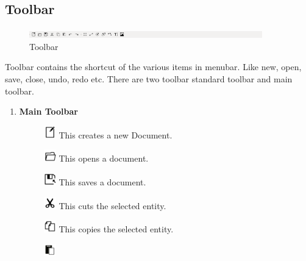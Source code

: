 \subsection{Toolbar}
\begin{figure}[h!]
\centering
\includegraphics[width=0.9\textwidth]{images/toolbar.png}
\caption{Toolbar}
\end{figure}
Toolbar contains the shortcut of the various items in menubar. Like new, open, save, close, undo, redo etc. There are two toolbar standard toolbar and main toolbar.
\begin{enumerate}
\item \textbf{Main Toolbar}
\begin{figure}[h!]
\includegraphics[width=0.05\textwidth]{images/newDrawing.jpg} 
This creates a new Document.
\end{figure}
\begin{figure}[h!]
\includegraphics[width=0.05\textwidth]{images/openDrawing.jpg} 
This opens a document.
\end{figure}
\begin{figure}[h!]
\includegraphics[width=0.05\textwidth]{images/saveDrawing.jpg} 
This saves a document.
\end{figure}
\begin{figure}[h!]
\includegraphics[width=0.05\textwidth]{images/cut.jpg} 
This cuts the selected entity.
\end{figure}
\begin{figure}[h!]
\includegraphics[width=0.05\textwidth]{images/copy.jpg} 
This copies the selected entity.
\end{figure}
\begin{figure}[h!]
\includegraphics[width=0.05\textwidth]{images/paste.jpg} 

\end{figure}
\end{enumerate}

